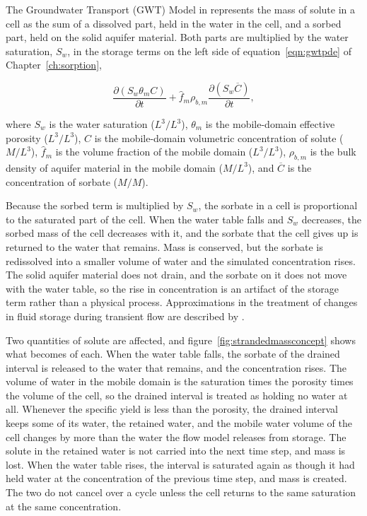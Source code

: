 The Groundwater Transport (GWT) Model \citep{modflow6gwt} in \mf represents the mass of solute in a cell as the sum of a dissolved part, held in the water in the cell, and a sorbed part, held on the solid aquifer material. Both parts are multiplied by the water saturation, $S_w$, in the storage terms on the left side of equation~\ref{eqn:gwtpde} of Chapter~\ref{ch:sorption},

\begin{equation}
\label{eqn:strandstorage}
\frac {\partial \left ( S_w \theta_m C \right )}{\partial t}
+ \hat{f}_m \rho_{b,m} \frac {\partial \left ( S_w \overline{C} \right ) }{\partial t} ,
\end{equation}

\noindent where $S_w$ is the water saturation ($L^3/L^3$), $\theta_m$ is the mobile-domain effective porosity ($L^3/L^3$), $C$ is the mobile-domain volumetric concentration of solute ($M/L^3$), $\hat{f}_m$ is the volume fraction of the mobile domain ($L^3/L^3$), $\rho_{b,m}$ is the bulk density of aquifer material in the mobile domain ($M/L^3$), and $\overline{C}$ is the concentration of sorbate ($M/M$).

Because the sorbed term is multiplied by $S_w$, the sorbate in a cell is proportional to the saturated part of the cell. When the water table falls and $S_w$ decreases, the sorbed mass of the cell decreases with it, and the sorbate that the cell gives up is returned to the water that remains. Mass is conserved, but the sorbate is redissolved into a smaller volume of water and the simulated concentration rises. The solid aquifer material does not drain, and the sorbate on it does not move with the water table, so the rise in concentration is an artifact of the storage term rather than a physical process. Approximations in the treatment of changes in fluid storage during transient flow are described by \citet{goode1990, goode1992}.

Two quantities of solute are affected, and figure~\ref{fig:strandedmassconcept} shows what becomes of each. When the water table falls, the sorbate of the drained interval is released to the water that remains, and the concentration rises. The volume of water in the mobile domain is the saturation times the porosity times the volume of the cell, so the drained interval is treated as holding no water at all. Whenever the specific yield is less than the porosity, the drained interval keeps some of its water, the retained water, and the mobile water volume of the cell changes by more than the water the flow model releases from storage. The solute in the retained water is not carried into the next time step, and mass is lost. When the water table rises, the interval is saturated again as though it had held water at the concentration of the previous time step, and mass is created. The two do not cancel over a cycle unless the cell returns to the same saturation at the same concentration.

